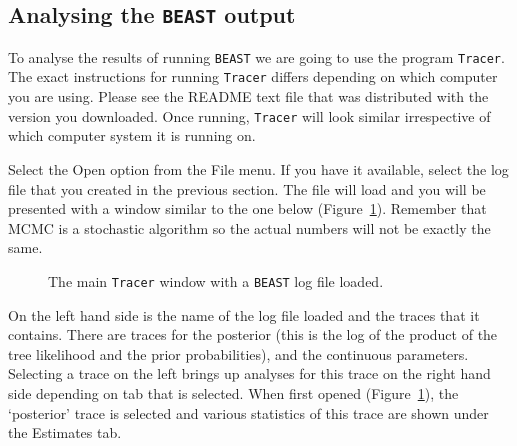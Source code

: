 \documentclass[cup7b, english]{cupbook}
\begin{document}
\subsection{Analysing the \texttt{BEAST} output}

To analyse the results of running \texttt{BEAST} we are going to use the program \texttt{Tracer}.
The exact instructions for running \texttt{Tracer} differs depending
on which computer you are using. Please see the README text file that was distributed with the
version you downloaded. Once running, \texttt{Tracer} will look similar irrespective of which computer system
it is running on.

Select the Open option from the File menu. If you have it available, select the log file
that you created in the previous section. The file will load and you will be
presented with a window similar to the one below (Figure~\ref{fig:figure5}). Remember that MCMC is a stochastic
algorithm so the actual numbers will not be exactly the same.

\begin{figure}[htbp]
\begin{center}
\leavevmode
{}
\end{center}
\caption{The main \texttt{Tracer} window with a \texttt{BEAST} log file loaded.}
\label{fig:figure5}
\end{figure}

On the left hand side is the name of the log file loaded and the traces that it contains.
There are traces for the posterior (this is the log of the product of the tree likelihood and
the prior probabilities), and the continuous parameters. Selecting a trace on the left
brings up analyses for this trace on the right hand side depending on tab that is
selected. When first opened (Figure~\ref{fig:figure5}), the `posterior' trace is selected and various statistics
of this trace are shown under the Estimates tab.
\end{document}
